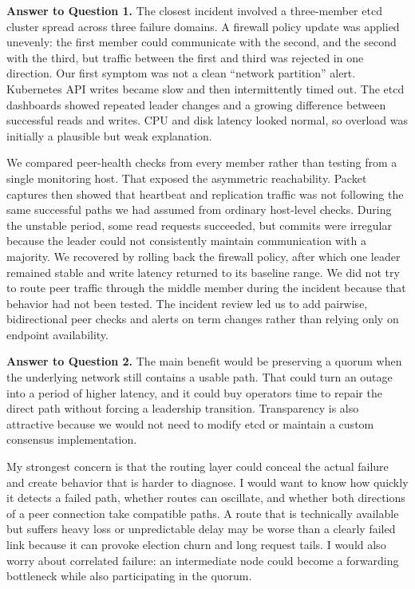 \documentclass[11pt,a4paper]{article}
\begin{document}
\textbf{Answer to Question 1.}
The closest incident involved a three-member etcd cluster spread across three failure domains. A firewall policy update was applied unevenly: the first member could communicate with the second, and the second with the third, but traffic between the first and third was rejected in one direction. Our first symptom was not a clean ``network partition'' alert. Kubernetes API writes became slow and then intermittently timed out. The etcd dashboards showed repeated leader changes and a growing difference between successful reads and writes. CPU and disk latency looked normal, so overload was initially a plausible but weak explanation.

We compared peer-health checks from every member rather than testing from a single monitoring host. That exposed the asymmetric reachability. Packet captures then showed that heartbeat and replication traffic was not following the same successful paths we had assumed from ordinary host-level checks. During the unstable period, some read requests succeeded, but commits were irregular because the leader could not consistently maintain communication with a majority. We recovered by rolling back the firewall policy, after which one leader remained stable and write latency returned to its baseline range. We did not try to route peer traffic through the middle member during the incident because that behavior had not been tested. The incident review led us to add pairwise, bidirectional peer checks and alerts on term changes rather than relying only on endpoint availability.

\textbf{Answer to Question 2.}
The main benefit would be preserving a quorum when the underlying network still contains a usable path. That could turn an outage into a period of higher latency, and it could buy operators time to repair the direct path without forcing a leadership transition. Transparency is also attractive because we would not need to modify etcd or maintain a custom consensus implementation.

My strongest concern is that the routing layer could conceal the actual failure and create behavior that is harder to diagnose. I would want to know how quickly it detects a failed path, whether routes can oscillate, and whether both directions of a peer connection take compatible paths. A route that is technically available but suffers heavy loss or unpredictable delay may be worse than a clearly failed link because it can provoke election churn and long request tails. I would also worry about correlated failure: an intermediate node could become a forwarding bottleneck while also participating in the quorum.
\end{document}

